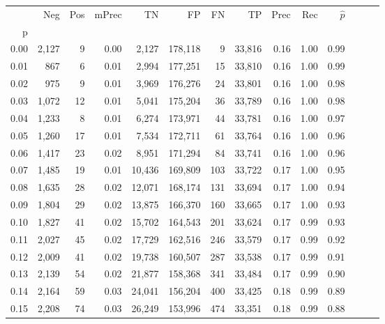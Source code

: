 \begin{tabular}{rrrrrrrrrrrrrr}
\toprule
{} &    Neg &  Pos & mPrec &       TN &       FP &      FN &      TP &  Prec &   Rec & $\hat{p}$ \\
p    &        &      &       &          &          &         &         &       &       &           \\
\midrule
0.00 &  2,127 &    9 &  0.00 &    2,127 &  178,118 &       9 &  33,816 &  0.16 &  1.00 &      0.99 \\
0.01 &    867 &    6 &  0.01 &    2,994 &  177,251 &      15 &  33,810 &  0.16 &  1.00 &      0.99 \\
0.02 &    975 &    9 &  0.01 &    3,969 &  176,276 &      24 &  33,801 &  0.16 &  1.00 &      0.98 \\
0.03 &  1,072 &   12 &  0.01 &    5,041 &  175,204 &      36 &  33,789 &  0.16 &  1.00 &      0.98 \\
0.04 &  1,233 &    8 &  0.01 &    6,274 &  173,971 &      44 &  33,781 &  0.16 &  1.00 &      0.97 \\
0.05 &  1,260 &   17 &  0.01 &    7,534 &  172,711 &      61 &  33,764 &  0.16 &  1.00 &      0.96 \\
0.06 &  1,417 &   23 &  0.02 &    8,951 &  171,294 &      84 &  33,741 &  0.16 &  1.00 &      0.96 \\
0.07 &  1,485 &   19 &  0.01 &   10,436 &  169,809 &     103 &  33,722 &  0.17 &  1.00 &      0.95 \\
0.08 &  1,635 &   28 &  0.02 &   12,071 &  168,174 &     131 &  33,694 &  0.17 &  1.00 &      0.94 \\
0.09 &  1,804 &   29 &  0.02 &   13,875 &  166,370 &     160 &  33,665 &  0.17 &  1.00 &      0.93 \\
0.10 &  1,827 &   41 &  0.02 &   15,702 &  164,543 &     201 &  33,624 &  0.17 &  0.99 &      0.93 \\
0.11 &  2,027 &   45 &  0.02 &   17,729 &  162,516 &     246 &  33,579 &  0.17 &  0.99 &      0.92 \\
0.12 &  2,009 &   41 &  0.02 &   19,738 &  160,507 &     287 &  33,538 &  0.17 &  0.99 &      0.91 \\
0.13 &  2,139 &   54 &  0.02 &   21,877 &  158,368 &     341 &  33,484 &  0.17 &  0.99 &      0.90 \\
0.14 &  2,164 &   59 &  0.03 &   24,041 &  156,204 &     400 &  33,425 &  0.18 &  0.99 &      0.89 \\
0.15 &  2,208 &   74 &  0.03 &   26,249 &  153,996 &     474 &  33,351 &  0.18 &  0.99 &      0.88 \\

\end{tabular}
